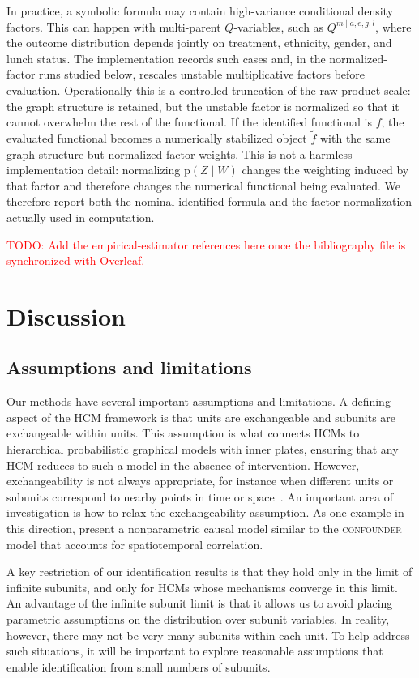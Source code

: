 \documentclass[12pt]{article}
\newcommand{\TODO}[1]{\textcolor{red}{TODO: #1}}
\newcommand{\pr}{\mathrm{p}}
\begin{document}
In practice, a symbolic formula may contain high-variance conditional
density factors. This can happen with multi-parent $Q$-variables, such
as $Q^{m\mid a,e,g,l}$, where the outcome distribution depends jointly
on treatment, ethnicity, gender, and lunch status. The implementation
records such cases and, in the normalized-factor runs studied below,
rescales unstable multiplicative factors before evaluation.
Operationally this is a controlled truncation of the raw product scale:
the graph structure is retained, but the unstable factor is normalized
so that it cannot overwhelm the rest of the functional. If the
identified functional is $f$, the evaluated functional becomes a
numerically stabilized object $\tilde{f}$ with the same graph structure
but normalized factor weights. This is not a harmless implementation
detail: normalizing $\pr(Z\mid W)$ changes the weighting induced by that
factor and therefore changes the numerical functional being evaluated.
We therefore report both the nominal identified formula and the factor
normalization actually used in computation.

\TODO{Add the empirical-estimator references here once the bibliography
file is synchronized with Overleaf.}

 \section{Discussion} \label{sec:discussion}

\subsection{Assumptions and limitations}

Our methods have several important assumptions and limitations.
A defining aspect of the HCM framework is that units are exchangeable and subunits are exchangeable within units.
This assumption is what connects HCMs to hierarchical probabilistic graphical models with inner plates, ensuring that any HCM reduces to such a model in the absence of intervention.
However, exchangeability is not always appropriate, for instance when different units or subunits correspond to nearby points in time or space~\citep{Bertrand2004-sg}.
An important area of investigation is how to relax the exchangeability assumption.
As one example in this direction, \citet{Christiansen2022-ip} present a
nonparametric causal model similar to the \textsc{confounder} model that
accounts for spatiotemporal correlation.

A key restriction of our identification results is that they hold only in the limit of infinite subunits, and only for HCMs whose mechanisms converge in this limit.
An advantage of the infinite subunit limit is that it allows us to avoid placing parametric assumptions on the distribution over subunit variables.
In reality, however, there may not be very many subunits within each unit.
To help address such situations, it will be important to explore reasonable assumptions that enable identification from small numbers of subunits.
\end{document}
